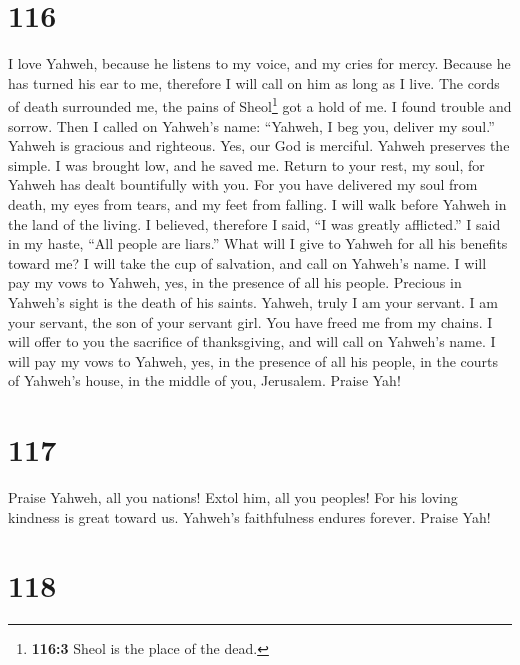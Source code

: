 \hypertarget{section-115}{%
\section{116}\label{section-115}}

 I love Yahweh, because he listens to my voice, and my
cries for mercy.  Because he has turned his ear to me,
therefore I will call on him as long as I live.  The cords
of death surrounded me, the pains of Sheol\footnote{\textbf{116:3} Sheol
  is the place of the dead.} got a hold of me. I found trouble and
sorrow.  Then I called on Yahweh's name: ``Yahweh, I beg
you, deliver my soul.''  Yahweh is gracious and righteous.
Yes, our God is merciful.  Yahweh preserves the simple. I
was brought low, and he saved me.  Return to your rest, my
soul, for Yahweh has dealt bountifully with you.  For you
have delivered my soul from death, my eyes from tears, and my feet from
falling.  I will walk before Yahweh in the land of the
living.  I believed, therefore I said, ``I was greatly
afflicted.''  I said in my haste, ``All people are
liars.''  What will I give to Yahweh for all his benefits
toward me?  I will take the cup of salvation, and call on
Yahweh's name.  I will pay my vows to Yahweh, yes, in the
presence of all his people.  Precious in Yahweh's sight
is the death of his saints.  Yahweh, truly I am your
servant. I am your servant, the son of your servant girl. You have freed
me from my chains.  I will offer to you the sacrifice of
thanksgiving, and will call on Yahweh's name.  I will pay
my vows to Yahweh, yes, in the presence of all his people,
 in the courts of Yahweh's house, in the middle of you,
Jerusalem. Praise Yah!

\hypertarget{section-116}{%
\section{117}\label{section-116}}

 Praise Yahweh, all you nations! Extol him, all you
peoples!  For his loving kindness is great toward us.
Yahweh's faithfulness endures forever. Praise Yah!

\hypertarget{section-117}{%
\section{118}\label{section-117}}

